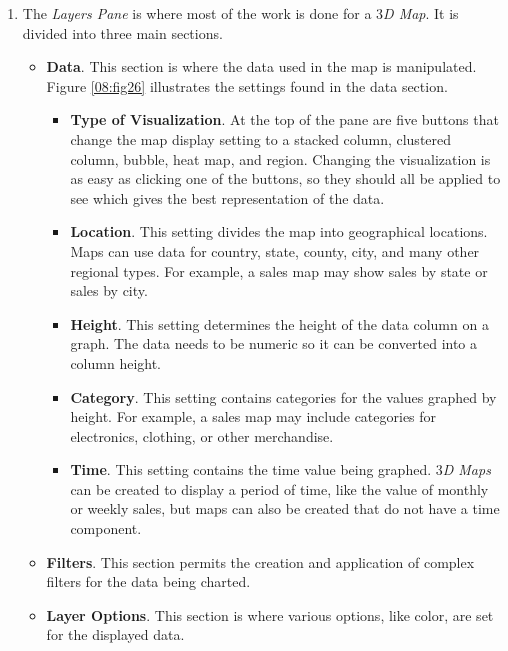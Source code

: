 \begin{enumerate}[resume]
	\item The \textit{Layers Pane} is where most of the work is done for a \textit{$ 3 $D Map}. It is divided into three main sections.
	
	\begin{itemize}
		\item \textbf{Data}. This section is where the data used in the map is manipulated. Figure \ref{08:fig26} illustrates the settings found in the data section.

		\begin{itemize}
			\item \textbf{Type of Visualization}. At the top of the pane are five buttons that change the map display setting to a stacked column, clustered column, bubble, heat map, and region. Changing the visualization is as easy as clicking one of the buttons, so they should all be applied to see which gives the best representation of the data.
			\item \textbf{Location}. This setting divides the map into geographical locations. Maps can use data for country, state, county, city, and many other regional types. For example, a sales map may show sales by state or sales by city.
			\item \textbf{Height}. This setting determines the height of the data column on a graph. The data needs to be numeric so it can be converted into a column height.
			\item \textbf{Category}. This setting contains categories for the values graphed by height. For example, a sales map may include categories for electronics, clothing, or other merchandise.
			\item \textbf{Time}. This setting contains the time value being graphed. \textit{$ 3 $D Maps} can be created to display a period of time, like the value of monthly or weekly sales, but maps can also be created that do not have a time component.
		\end{itemize}		

		\item \textbf{Filters}. This section permits the creation and application of complex filters for the data being charted.
		\item \textbf{Layer Options}. This section is where various options, like color, are set for the displayed data.
	\end{itemize}


\end{enumerate}
